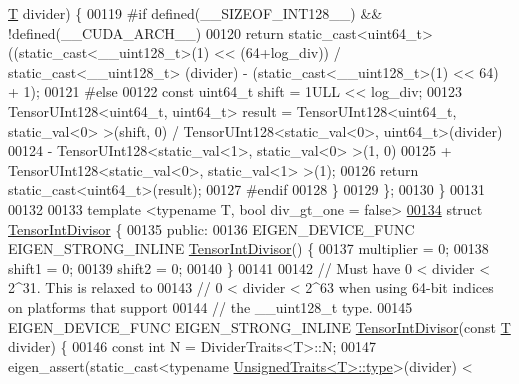 \begin{DoxyCode}
      \hyperlink{group___sparse_core___module_class_eigen_1_1_triplet}{T} divider) \{
00119 \textcolor{preprocessor}{#if defined(\_\_SIZEOF\_INT128\_\_) && !defined(\_\_CUDA\_ARCH\_\_)}
00120       \textcolor{keywordflow}{return} \textcolor{keyword}{static\_cast<}uint64\_t\textcolor{keyword}{>}((\textcolor{keyword}{static\_cast<}\_\_uint128\_t\textcolor{keyword}{>}(1) << (64+log\_div)) / static\_cast<\_\_uint128\_t>
      (divider) - (\textcolor{keyword}{static\_cast<}\_\_uint128\_t\textcolor{keyword}{>}(1) << 64) + 1);
00121 \textcolor{preprocessor}{#else}
00122       \textcolor{keyword}{const} uint64\_t shift = 1ULL << log\_div;
00123       TensorUInt128<uint64\_t, uint64\_t> result = TensorUInt128<uint64\_t, static\_val<0> >(shift, 0) / 
      TensorUInt128<static\_val<0>, uint64\_t>(divider)
00124                                                - TensorUInt128<static\_val<1>, static\_val<0> >(1, 0)
00125                                                + TensorUInt128<static\_val<0>, static\_val<1> >(1);
00126       \textcolor{keywordflow}{return} \textcolor{keyword}{static\_cast<}uint64\_t\textcolor{keyword}{>}(result);
00127 \textcolor{preprocessor}{#endif}
00128     \}
00129   \};
00130 \}
00131 
00132 
00133 \textcolor{keyword}{template} <\textcolor{keyword}{typename} T, \textcolor{keywordtype}{bool} div\_gt\_one = false>
\hyperlink{struct_eigen_1_1internal_1_1_tensor_int_divisor}{00134} \textcolor{keyword}{struct }\hyperlink{struct_eigen_1_1internal_1_1_tensor_int_divisor}{TensorIntDivisor} \{
00135  \textcolor{keyword}{public}:
00136   EIGEN\_DEVICE\_FUNC EIGEN\_STRONG\_INLINE \hyperlink{struct_eigen_1_1internal_1_1_tensor_int_divisor}{TensorIntDivisor}() \{
00137     multiplier = 0;
00138     shift1 = 0;
00139     shift2 = 0;
00140   \}
00141 
00142   \textcolor{comment}{// Must have 0 < divider < 2^31. This is relaxed to}
00143   \textcolor{comment}{// 0 < divider < 2^63 when using 64-bit indices on platforms that support}
00144   \textcolor{comment}{// the \_\_uint128\_t type.}
00145   EIGEN\_DEVICE\_FUNC EIGEN\_STRONG\_INLINE \hyperlink{struct_eigen_1_1internal_1_1_tensor_int_divisor}{TensorIntDivisor}(\textcolor{keyword}{const} \hyperlink{group___sparse_core___module}{T} divider) \{
00146     \textcolor{keyword}{const} \textcolor{keywordtype}{int} N = DividerTraits<T>::N;
00147     eigen\_assert(\textcolor{keyword}{static\_cast<}typename \hyperlink{class_eigen_1_1internal_1_1_tensor_lazy_evaluator_writable}{UnsignedTraits<T>::type}\textcolor{keyword}{>}(divider) < 

\end{DoxyCode}

